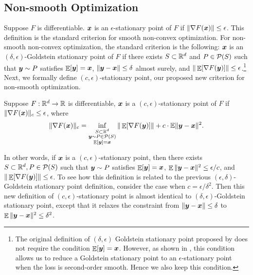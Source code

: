 \subsection{Non-smooth Optimization}

Suppose $F$ is differentiable. ${\boldsymbol{x}}$ is an $\epsilon$-stationary point of $F$ if $\|\nabla F({\boldsymbol{x}})\|\le \epsilon$. This definition is the standard criterion for smooth non-convex optimization.
For non-smooth non-convex optimization, the standard criterion is the following: ${\boldsymbol{x}}$ is an $(\delta,\epsilon)$-Goldstein stationary point of $F$ if there exists $S\subset \mathbb R^d$ and $P\in{\cal P}(S)$ such that ${\boldsymbol{y}}\sim P$ satisfies $\mathop{\mathbb{E}}[{\boldsymbol{y}}]={\boldsymbol{x}}$, $\|{\boldsymbol{y}}-{\boldsymbol{x}}\|\le\delta$ almost surely, and $\|\mathop{\mathbb{E}}[\nabla F({\boldsymbol{y}})]\|\le\epsilon$.\footnote{The original definition of $(\delta,\epsilon)$ Goldstein stationary point proposed by \cite{zhang2020complexity} does not require the condition $\mathop{\mathbb{E}}[{\boldsymbol{y}}]={\boldsymbol{x}}$. However, as shown in \cite{cutkosky2023optimal}, this condition allows us to reduce a Goldstein stationary point to an $\epsilon$-stationary point when the loss is second-order smooth. Hence we also keep this condition.} Next, we formally define $(c,\epsilon)$-stationary point, our proposed new criterion for non-smooth optimization.

\begin{definition}
\label{def:Exp-O2NC:stationary-point}
Suppose $F:\mathbb R^d\to\mathbb R$ is differentiable, ${\boldsymbol{x}}$ is a $(c,\epsilon)$-stationary point of $F$ if $\|\nabla F({\boldsymbol{x}})\|_c \le \epsilon$, where
\begin{equation*}
    \|\nabla F({\boldsymbol{x}})\|_c = \inf_{\substack{S\subset \mathbb R^d \\ {\boldsymbol{y}}\sim P\in{\cal P}(S) \\ \mathop{\mathbb{E}}[{\boldsymbol{y}}]={\boldsymbol{x}}}} \| \mathop{\mathbb{E}}[\nabla F({\boldsymbol{y}})]\| + c \cdot \mathbb{E}\|{\boldsymbol{y}}-{\boldsymbol{x}}\|^2.
\end{equation*}
\end{definition}

In other words, if ${\boldsymbol{x}}$ is a $(c,\epsilon)$-stationary point, then there exists $S\subset \mathbb R^d, P\in{\cal P}(S)$ such that ${\boldsymbol{y}}\sim P$ satisfies $\mathop{\mathbb{E}}[{\boldsymbol{y}}]={\boldsymbol{x}}$, $\mathop{\mathbb{E}}\|{\boldsymbol{y}}-{\boldsymbol{x}}\|^2 \le \epsilon/c$, and $\|\mathop{\mathbb{E}}[\nabla F({\boldsymbol{y}})]\|\le \epsilon$. To see how this definition is related to the previous $(\epsilon,\delta)$-Goldstein stationary point definition, consider the case when $c=\epsilon/\delta^2$. Then this new definition of $(c,\epsilon)$-stationary point is almost identical to $(\delta,\epsilon)$-Goldstein stationary point, except that it relaxes the constraint from $\|{\boldsymbol{y}}-{\boldsymbol{x}}\|\le\delta$ to $\mathop{\mathbb{E}}\|{\boldsymbol{y}}-{\boldsymbol{x}}\|^2\le\delta^2$. 

